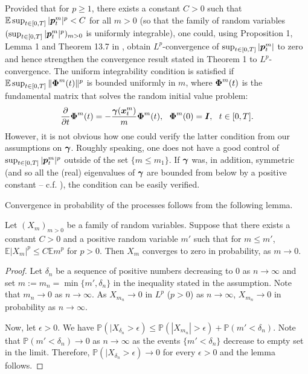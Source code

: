 \begin{remark}
Provided that  for $p \geq 1$,  there exists a constant $C>0$ such that $\mathbb{E} \sup_{t \in [0,T]} |\boldsymbol{p}_t^m|^p < C$ for all $m>0$ (so that the family of random variables $(\sup_{t \in [0,T]} |\boldsymbol{p}_t^m|^p)_{m > 0}$ is uniformly integrable), one could, using Proposition 1, Lemma 1 and Theorem 13.7 in \cite{williams1991probability}, obtain $L^p$-convergence of $\sup_{t \in [0,T]} |\boldsymbol{p}_t^m|$ to zero and hence strengthen the convergence result stated in Theorem 1 to $L^p$-convergence. The uniform integrability condition is satisfied if $\mathbb{E} \sup_{t \in [0,T]} \|\boldsymbol{\Phi}^m(t)\|^p$ is bounded uniformly in $m$, where $\boldsymbol{\Phi}^m(t)$ is the fundamental matrix that solves the random initial value problem: 
\begin{equation}
\frac{\partial}{\partial t} \vecc{\Phi}^m(t) = -\frac{\vecc{\gamma}(\vecc{x}_t^m)}{m} \vecc{\Phi}^m(t),  \ \ \vecc{\Phi}^m(0) = \vecc{I}, \ \  t \in [0,T].
\end{equation}
However, it is not obvious how one could verify the latter condition from our assumptions on $\boldsymbol{\gamma}$. Roughly speaking, one does not have a good control of $\sup_{t \in [0,T]} |\boldsymbol{p}_t^m|^p$ outside of the set $\{m \leq m_1\}$. If $\boldsymbol{\gamma}$ was, in addition, symmetric (and so all the (real) eigenvalues of $\boldsymbol{\gamma}$ are bounded from below by a positive constant --  c.f. \cite{ birrell2017homogenization}),  the condition can be easily verified. 
\end{remark}





Convergence in probability of the processes follows from the following lemma. 

\begin{lemma} Let $(X_m)_{m > 0}$ be a family of random variables. Suppose that there exists a constant $C>0$ and a positive random variable $m'$ such that for $m \leq m'$, $\mathbb{E} |X_m|^p \leq C \mathbb{E} m^p$ for $p>0$. Then $X_m$ converges to zero in probability, as $m \to 0$. 
\end{lemma}
\begin{proof}
Let $\delta_n$ be a sequence of positive numbers decreasing to $0$ as $n \to \infty$ and set $m := m_n = \min\{m',\delta_n\}$ in the inequality stated in the assumption. Note that $m_n \to 0$ as $n \to \infty$. As $X_{m_n} \to 0$ in $L^p$ ($p>0$) as $n \to \infty$, $X_{m_n} \to 0$ in probability as $n \to \infty$.  

Now, let $\epsilon > 0$. We have $\mathbb{P}(|X_{\delta_n} > \epsilon) \leq \mathbb{P}(|X_{m_n}| > \epsilon) + \mathbb{P}(m' < \delta_n)$. Note that $\mathbb{P}(m' < \delta_n) \to 0$ as $n \to \infty$ as the events $\{m' < \delta_n\}$ decrease to empty set in the limit. Therefore, $\mathbb{P}(|X_{\delta_n} > \epsilon) \to 0$ for every $\epsilon > 0$ and the lemma follows.
\end{proof}





